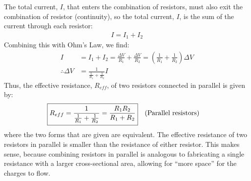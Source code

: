 The total current, $I$, that enters the combination of resistors, must also exit the combination of resistor (continuity), so the total current, $I$, is the sum of the current through each resistor:
\begin{align*}
I=I_1+I_2
\end{align*}
Combining this with Ohm's Law, we find:
\begin{align*}
I&=I_1+I_2=\frac{\Delta V}{R_1}+\frac{\Delta V}{R_2}=\left( \frac{1}{R_1}+\frac{1}{R_2} \right)\Delta V\\
\therefore \Delta V &= \frac{1}{\frac{1}{R_1}+\frac{1}{R_2}}I
\end{align*}
Thus, the effective resistance, $R_{eff}$, of two resistors connected in parallel is given by:
\begin{align*}
\Aboxed{R_{eff}=\frac{1}{\frac{1}{R_1}+\frac{1}{R_2}}=\frac{R_1R_2}{R_1+R_2}}\quad \text{(Parallel resistors)}
\end{align*}
where the two forms that are given are equivalent. The effective resistance of two resistors in parallel is smaller than the resistance of either resistor. This makes sense, because combining resistors in parallel is analogous to fabricating a single resistance with a larger cross-sectional area, allowing for ``more space'' for the charges to flow.

